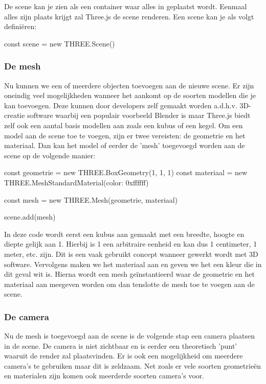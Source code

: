 De scene kan je zien als een container waar alles in geplaatst wordt. Eenmaal alles zijn plaats krijgt zal Three.js de scene renderen. Een scene kan je als volgt definiëren: 

\begin{LVerbatim}
const scene = new THREE.Scene()
\end{LVerbatim}

\subsubsection{De mesh}

Nu kunnen we een of meerdere objecten toevoegen aan de nieuwe scene. Er zijn oneindig veel mogelijkheden wanneer het aankomt op de soorten modellen die je kan toevoegen. Deze kunnen door developers zelf gemaakt worden a.d.h.v. 3D-creatie software waarbij een populair voorbeeld Blender is maar Three.js biedt zelf ook een aantal basis modellen aan zoals een kubus of een kegel.
Om een model aan de scene toe te voegen, zijn er twee vereisten: de geometrie en het materiaal. Dan kan het model of eerder de 'mesh' toegevoegd worden aan de scene op de volgende manier:

\begin{LVerbatim}
const geometrie = new THREE.BoxGeometry(1, 1, 1)
const materiaal = new THREE.MeshStandardMaterial({color: 0xffffff})

const mesh = new THREE.Mesh(geometrie, materiaal)

scene.add(mesh)
\end{LVerbatim}

In deze code wordt eerst een kubus aan gemaakt met een breedte, hoogte en diepte gelijk aan 1. Hierbij is 1 een arbitraire eenheid en kan dus 1 centimeter, 1 meter, etc. zijn. Dit is een vaak gebruikt concept wanneer gewerkt wordt met 3D software. Vervolgens maken we het materiaal aan en geven we het een kleur die in dit geval wit is. Hierna wordt een mesh geïnstantieerd waar de geometrie en het materiaal aan meegeven worden om dan tenslotte de mesh toe te voegen aan de scene.

\subsubsection{De camera}

Nu de mesh is toegevoegd aan de scene is de volgende stap een camera plaatsen in de scene. De camera is niet zichtbaar en is eerder een theoretisch 'punt' waaruit de render zal plaatsvinden. Er is ook een mogelijkheid om meerdere camera's te gebruiken maar dit is zeldzaam. Net zoals er vele soorten geometrieën en materialen zijn komen ook meerderde soorten camera's voor.

